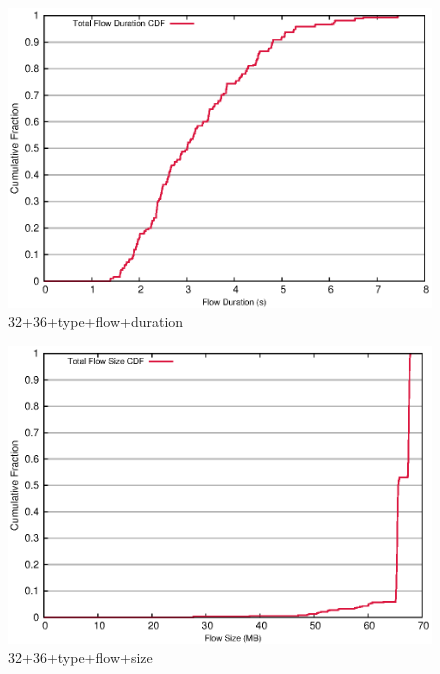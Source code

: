\documentclass[landscape]{article}
\begin{document}
\begin{figure}[!hbt]
\centering
\includegraphics[width=1\textwidth]{32_36_type_flow_duration.eps}
\caption{32+36+type+flow+duration}

\end{figure}


\newpage

\begin{figure}[!hbt]
\centering
\includegraphics[width=1\textwidth]{32_36_type_flow_size.eps}
\caption{32+36+type+flow+size}

\end{figure}


\newpage
\end{document}
